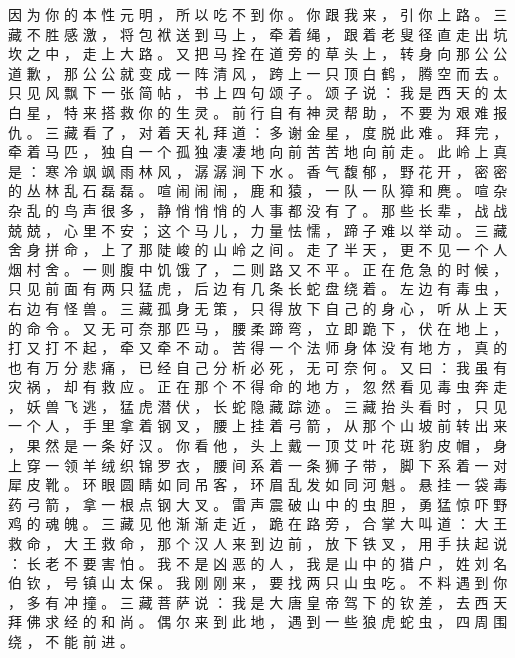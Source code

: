 {因 为 你 的 本 性 元 明 ， 所 以 吃 不 到 你 。
你 跟 我 来 ， 引 你 上 路 。
三 藏 不 胜 感 激 ， 将 包 袱 送 到 马 上 ， 牵 着 绳 ， 跟 着 老 叟 径 直 走 出 坑 坎 之 中 ， 走 上 大 路 。
又 把 马 拴 在 道 旁 的 草 头 上 ， 转 身 向 那 公 公 道 歉 ， 那 公 公 就 变 成 一 阵 清 风 ， 跨 上 一 只 顶 白 鹤 ， 腾 空 而 去 。
只 见 风 飘 下 一 张 简 帖 ， 书 上 四 句 颂 子 。
颂 子 说 ： 我 是 西 天 的 太 白 星 ， 特 来 搭 救 你 的 生 灵 。
前 行 自 有 神 灵 帮 助 ， 不 要 为 艰 难 报 仇 。
三 藏 看 了 ， 对 着 天 礼 拜 道 ： 多 谢 金 星 ， 度 脱 此 难 。
拜 完 ， 牵 着 马 匹 ， 独 自 一 个 孤 独 凄 凄 地 向 前 苦 苦 地 向 前 走 。
此 岭 上 真 是 ： 寒 冷 飒 飒 雨 林 风 ， 潺 潺 涧 下 水 。
香 气 馥 郁 ， 野 花 开 ， 密 密 的 丛 林 乱 石 磊 磊 。
喧 闹 闹 闹 ， 鹿 和 猿 ， 一 队 一 队 獐 和 麂 。
喧 杂 杂 乱 的 鸟 声 很 多 ， 静 悄 悄 悄 的 人 事 都 没 有 了 。
那 些 长 辈 ， 战 战 兢 兢 ， 心 里 不 安 ； 这 个 马 儿 ， 力 量 怯 懦 ， 蹄 子 难 以 举 动 。
三 藏 舍 身 拼 命 ， 上 了 那 陡 峻 的 山 岭 之 间 。
走 了 半 天 ， 更 不 见 一 个 人 烟 村 舍 。
一 则 腹 中 饥 饿 了 ， 二 则 路 又 不 平 。
正 在 危 急 的 时 候 ， 只 见 前 面 有 两 只 猛 虎 ， 后 边 有 几 条 长 蛇 盘 绕 着 。
左 边 有 毒 虫 ， 右 边 有 怪 兽 。
三 藏 孤 身 无 策 ， 只 得 放 下 自 己 的 身 心 ， 听 从 上 天 的 命 令 。
又 无 可 奈 那 匹 马 ， 腰 柔 蹄 弯 ， 立 即 跪 下 ， 伏 在 地 上 ， 打 又 打 不 起 ， 牵 又 牵 不 动 。
苦 得 一 个 法 师 身 体 没 有 地 方 ， 真 的 也 有 万 分 悲 痛 ， 已 经 自 己 分 析 必 死 ， 无 可 奈 何 。
又 曰 ： 我 虽 有 灾 祸 ， 却 有 救 应 。
正 在 那 个 不 得 命 的 地 方 ， 忽 然 看 见 毒 虫 奔 走 ， 妖 兽 飞 逃 ， 猛 虎 潜 伏 ， 长 蛇 隐 藏 踪 迹 。
三 藏 抬 头 看 时 ， 只 见 一 个 人 ， 手 里 拿 着 钢 叉 ， 腰 上 挂 着 弓 箭 ， 从 那 个 山 坡 前 转 出 来 ， 果 然 是 一 条 好 汉 。
你 看 他 ， 头 上 戴 一 顶 艾 叶 花 斑 豹 皮 帽 ， 身 上 穿 一 领 羊 绒 织 锦 罗 衣 ， 腰 间 系 着 一 条 狮 子 带 ， 脚 下 系 着 一 对 犀 皮 靴 。
环 眼 圆 睛 如 同 吊 客 ， 环 眉 乱 发 如 同 河 魁 。
悬 挂 一 袋 毒 药 弓 箭 ， 拿 一 根 点 钢 大 叉 。
雷 声 震 破 山 中 的 虫 胆 ， 勇 猛 惊 吓 野 鸡 的 魂 魄 。
三 藏 见 他 渐 渐 走 近 ， 跪 在 路 旁 ， 合 掌 大 叫 道 ： 大 王 救 命 ， 大 王 救 命 ， 那 个 汉 人 来 到 边 前 ， 放 下 铁 叉 ， 用 手 扶 起 说 ： 长 老 不 要 害 怕 。
我 不 是 凶 恶 的 人 ， 我 是 山 中 的 猎 户 ， 姓 刘 名 伯 钦 ， 号 镇 山 太 保 。
我 刚 刚 来 ， 要 找 两 只 山 虫 吃 。
不 料 遇 到 你 ， 多 有 冲 撞 。
三 藏 菩 萨 说 ： 我 是 大 唐 皇 帝 驾 下 的 钦 差 ， 去 西 天 拜 佛 求 经 的 和 尚 。
偶 尔 来 到 此 地 ， 遇 到 一 些 狼 虎 蛇 虫 ， 四 周 围 绕 ， 不 能 前 进 。
}
